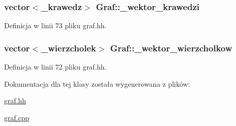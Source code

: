 \hypertarget{class_graf_a79c79b147cde2bb403d3aa27db8f9f22}{
\subsubsection[{\-\_\-wektor\-\_\-krawedzi}]{\setlength{\rightskip}{0pt plus 5cm}vector$<${\bf \-\_\-krawedz}$>$ {\bf \-Graf\-::\-\_\-wektor\-\_\-krawedzi}}}\label{class_graf_a79c79b147cde2bb403d3aa27db8f9f22}


\-Definicja w linii 73 pliku graf.\-hh.

\hypertarget{class_graf_a6156d0fd54662028922b4134a92cb357}{
\subsubsection[{\-\_\-wektor\-\_\-wierzcholkow}]{\setlength{\rightskip}{0pt plus 5cm}vector$<${\bf \-\_\-wierzcholek}$>$ {\bf \-Graf\-::\-\_\-wektor\-\_\-wierzcholkow}}}\label{class_graf_a6156d0fd54662028922b4134a92cb357}


\-Definicja w linii 72 pliku graf.\-hh.



\-Dokumentacja dla tej klasy została wygenerowana z plików\-:\begin{DoxyCompactItemize}
\item 
\hyperlink{graf_8hh}{graf.\-hh}\item 
\hyperlink{graf_8cpp}{graf.\-cpp}\end{DoxyCompactItemize}
